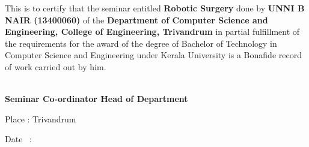 \vspace{.6cm}
\begin{Large}
\begin{spacing}{1.5}
\hspace{1.5cm} This  is  to certify that the seminar entitled {\bf Robotic Surgery} done by {\bf  UNNI B NAIR (13400060)} of the {\bf Department of Computer Science and Engineering, College of Engineering, Trivandrum} in partial fulfillment of the requirements for the award of the degree of Bachelor of Technology in Computer Science and Engineering under Kerala University is a Bonafide record of work carried out by him.
\vspace{2cm}
\end{spacing}

\bf\Large \hspace{.3cm}\hspace{1.7cm} \hspace{3cm} \\
\bf\Large \hspace{1cm}Seminar Co-ordinator    \hspace{4cm} Head of Department

\vspace{2cm}
\begin{spacing}{1.4}
\noindent Place : Trivandrum

\noindent Date \ : 
\end{spacing}
\end{Large}

